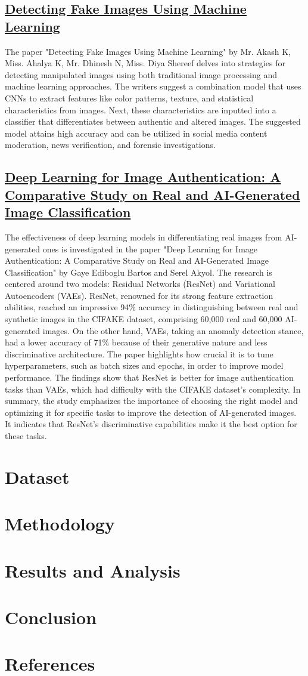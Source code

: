 \documentclass[10pt,twocolumn,letterpaper]{article}
\begin{document}
\subsection{\href{https://ijrpr.com/uploads/V4ISSUE4/IJRPR11629.pdf}{Detecting Fake Images Using Machine Learning}}
The paper "Detecting Fake Images Using Machine Learning" by Mr. Akash K, Miss. Ahalya K, Mr. Dhinesh N, Miss. Diya Shereef delves into strategies for detecting manipulated images using both traditional image processing and machine learning approaches. The writers suggest a combination model that uses CNNs to extract features like color patterns, texture, and statistical characteristics from images. Next, these characteristics are inputted into a classifier that differentiates between authentic and altered images. The suggested model attains high accuracy and can be utilized in social media content moderation, news verification, and forensic investigations.

\subsection{\href{https://www.researchgate.net/publication/375952278_Deep_Learning_for_Image_Authentication_A_Comparative_Study_on_Real_and_AI-Generated_Image_Classification}{Deep Learning for Image Authentication: A Comparative Study on Real and AI-Generated Image Classification}}
The effectiveness of deep learning models in differentiating real images from AI-generated ones is investigated in the paper "Deep Learning for Image Authentication: A Comparative Study on Real and AI-Generated Image Classification" by Gaye Ediboglu Bartos and Serel Akyol. The research is centered around two models: Residual Networks (ResNet) and Variational Autoencoders (VAEs). ResNet, renowned for its strong feature extraction abilities, reached an impressive 94\% accuracy in distinguishing between real and synthetic images in the CIFAKE dataset, comprising 60,000 real and 60,000 AI-generated images. On the other hand, VAEs, taking an anomaly detection stance, had a lower accuracy of 71\% because of their generative nature and less discriminative architecture. The paper highlights how crucial it is to tune hyperparameters, such as batch sizes and epochs, in order to improve model performance. The findings show that ResNet is better for image authentication tasks than VAEs, which had difficulty with the CIFAKE dataset's complexity. In summary, the study emphasizes the importance of choosing the right model and optimizing it for specific tasks to improve the detection of AI-generated images. It indicates that ResNet's discriminative capabilities make it the best option for these tasks.

\section{Dataset}
\section{Methodology}
\section{Results and Analysis}
\section{Conclusion}
\section{References}
\end{document}
